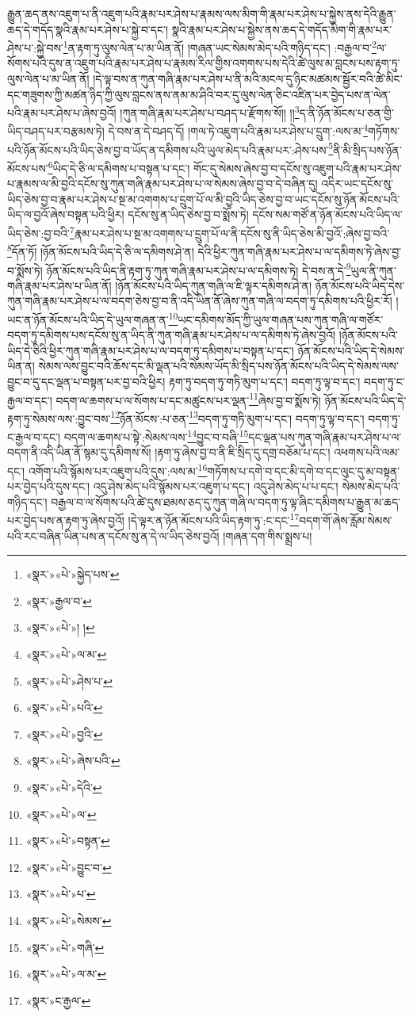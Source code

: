 རྒྱུན་ཆད་ནས་འཇུག་པ་ནི་འཇུག་པའི་རྣམ་པར་ཤེས་པ་རྣམས་ལས་མིག་གི་རྣམ་པར་ཤེས་པ་སྐྱེས་ནས་དེའི་རྒྱུན་ཆད་དེ་གདོད་སྣའི་རྣམ་པར་ཤེས་པ་སྐྱེ་བ་དང་། སྣའི་རྣམ་པར་ཤེས་པ་སྐྱེས་ནས་ཆད་དེ་གདོད་མིག་གི་རྣམ་པར་ཤེས་པ་:སྐྱེ་བས་\footnote{«སྣར་»«པེ་»སྐྱེད་པས་}ན་རྟག་ཏུ་ལུས་ལེན་པ་མ་ཡིན་ནོ། །གཞན་ཡང་སེམས་མེད་པའི་གཉིད་དང་། :བརྒྱལ་བ་\footnote{«སྣར་»རྒྱལ་བ་}ལ་སོགས་པའི་དུས་ན་འཇུག་པའི་རྣམ་པར་ཤེས་པ་རྣམས་རིལ་གྱིས་འགགས་པས་དེའི་ཚེ་ལུས་མ་བླངས་པས་རྟག་ཏུ་ལུས་ལེན་པ་མ་ཡིན་ནོ། །དེ་ལྟ་བས་ན་ཀུན་གཞི་རྣམ་པར་ཤེས་པ་ནི་མའི་མངལ་དུ་ཉིང་མཚམས་སྦྱོར་བའི་ཚེ་མིང་དང་གཟུགས་ཀྱི་མཚན་ཉིད་ཀྱི་ལུས་བླངས་ནས་ནམ་མ་ཤིའི་བར་དུ་ལུས་ལེན་ཅིང་འཛིན་པར་བྱེད་པས་ན་ལེན་པའི་རྣམ་པར་ཤེས་པ་ཞེས་བྱའོ། །ཀུན་གཞི་རྣམ་པར་ཤེས་པ་བཤད་པ་རྫོགས་སོ།། །།\footnote{«སྣར་»«པེ་»། །}ད་ནི་ཉོན་མོངས་པ་ཅན་གྱི་ཡིད་བཤད་པར་བརྩམས་ཏེ། དེ་བས་ན་དེ་བཤད་དོ། །གལ་ཏེ་འཇུག་པའི་རྣམ་པར་ཤེས་པ་དྲུག་:ལས་མ་\footnote{«སྣར་»«པེ་»ལ་མ་}གཏོགས་པའི་ཉོན་མོངས་པའི་ཡིད་ཅེས་བྱ་བ་ཡོད་ན་དམིགས་པའི་ཡུལ་མེད་པའི་རྣམ་པར་:ཤེས་པས་\footnote{«སྣར་»«པེ་»ཤེས་པ་}ནི་མི་སྲིད་པས་ཉོན་མོངས་པས་\footnote{«སྣར་»«པེ་»པའི་}ཡིད་དེ་ཅི་ལ་དམིགས་པ་བསྟན་པ་དང་། གོང་དུ་སེམས་ཞེས་བྱ་བ་དངོས་སུ་འཇུག་པའི་རྣམ་པར་ཤེས་པ་རྣམས་ལ་མི་བྱའི་དངོས་སུ་ཀུན་གཞི་རྣམ་པར་ཤེས་པ་ལ་སེམས་ཞེས་བྱ་བ་དེ་བཞིན་དུ། འདིར་ཡང་དངོས་སུ་ཡིད་ཅེས་བྱ་བ་རྣམ་པར་ཤེས་པ་སྔ་མ་འགགས་པ་དྲུག་པོ་ལ་མི་བྱའི་ཡིད་ཅེས་བྱ་བ་ཡང་དངོས་སུ་ཉོན་མོངས་པའི་ཡིད་ལ་བྱའོ་ཞེས་བསྟན་པའི་ཕྱིར། དངོས་སུ་ན་ཡིད་ཅེས་བྱ་བ་སྨོས་ཏེ། དངོས་སམ་གཙོ་ན་ཉོན་མོངས་པའི་ཡིད་ལ་ཡིད་ཅེས་:བྱ་བའི་\footnote{«སྣར་»«པེ་»བྱའི་}རྣམ་པར་ཤེས་པ་སྔ་མ་འགགས་པ་དྲུག་པོ་ལ་ནི་དངོས་སུ་ནི་ཡིད་ཅེས་མི་བྱའོ་:ཞེས་བྱ་བའི་\footnote{«སྣར་»«པེ་»ཞེས་པའི་}དོན་ཏོ། །ཉོན་མོངས་པའི་ཡིད་དེ་ཅི་ལ་དམིགས་ཤེ་ན། དེའི་ཕྱིར་ཀུན་གཞི་རྣམ་པར་ཤེས་པ་ལ་དམིགས་ཏེ་ཞེས་བྱ་བ་སྨོས་ཏེ། ཉོན་མོངས་པའི་ཡིད་ནི་རྟག་ཏུ་ཀུན་གཞི་རྣམ་པར་ཤེས་པ་ལ་དམིགས་ཏེ། དེ་བས་ན་དེ་\footnote{«སྣར་»«པེ་»དེའི་}ཡུལ་ནི་ཀུན་གཞི་རྣམ་པར་ཤེས་པ་ཡིན་ནོ། །ཉོན་མོངས་པའི་ཡིད་ཀུན་གཞི་ལ་ཇི་ལྟར་དམིགས་ཤེ་ན། ཉོན་མོངས་པའི་ཡིད་དེས་ཀུན་གཞི་རྣམ་པར་ཤེས་པ་ལ་བདག་ཅེས་བྱ་བ་ནི་འདི་ཡིན་ནོ་ཞེས་ཀུན་གཞི་ལ་བདག་ཏུ་དམིགས་པའི་ཕྱིར་རོ། །ཡང་ན་ཉོན་མོངས་པའི་ཡིད་དེ་ཡུལ་གཞན་ན་\footnote{«སྣར་»«པེ་»ལ་}ཡང་དམིགས་མོད་ཀྱི་ཡུལ་གཞན་པས་ཀུན་གཞི་ལ་གཙོར་བདག་ཏུ་དམིགས་པས་དངོས་སུ་ན་ཡིད་ནི་ཀུན་གཞི་རྣམ་པར་ཤེས་པ་ལ་དམིགས་ཏེ་ཞེས་བྱའོ། །ཉོན་མོངས་པའི་ཡིད་དེ་ཅིའི་ཕྱིར་ཀུན་གཞི་རྣམ་པར་ཤེས་པ་ལ་བདག་ཏུ་དམིགས་པ་བསྟན་པ་དང་། ཉོན་མོངས་པའི་ཡིད་དེ་སེམས་ཡིན་ན། སེམས་ལས་བྱུང་བའི་ཆོས་དང་མི་ལྡན་པའི་སེམས་ཡོད་མི་སྲིད་པས་ཉོན་མོངས་པའི་ཡིད་དེ་སེམས་ལས་བྱུང་བ་དུ་དང་ལྡན་པ་བསྟན་པར་བྱ་བའི་ཕྱིར། རྟག་ཏུ་བདག་ཏུ་གཏི་མུག་པ་དང་། བདག་ཏུ་ལྟ་བ་དང་། བདག་ཏུ་ང་རྒྱལ་བ་དང་། བདག་ལ་ཆགས་པ་ལ་སོགས་པ་དང་མཚུངས་པར་ལྡན་\footnote{«སྣར་»«པེ་»བསྟན་}ཞེས་བྱ་བ་སྨོས་ཏེ། ཉོན་མོངས་པའི་ཡིད་དེ་རྟག་ཏུ་སེམས་ལས་:བྱུང་བས་\footnote{«སྣར་»«པེ་»བྱུང་བ་}ཉོན་མོངས་:པ་ཅན་\footnote{«སྣར་»«པེ་»པ་}བདག་ཏུ་གཏི་མུག་པ་དང་། བདག་ཏུ་ལྟ་བ་དང་། བདག་ཏུ་ང་རྒྱལ་བ་དང་། བདག་ལ་ཆགས་པ་སྟེ་:སེམས་ལས་\footnote{«སྣར་»«པེ་»སེམས་}བྱུང་བ་བཞི་\footnote{«སྣར་»«པེ་»གཞི་}དང་ལྡན་པས་ཀུན་གཞི་རྣམ་པར་ཤེས་པ་ལ་བདག་ནི་འདི་ཡིན་ནོ་སྙམ་དུ་དམིགས་སོ། །རྟག་ཏུ་ཞེས་བྱ་བ་ནི་ཇི་སྲིད་དུ་དགྲ་བཅོམ་པ་དང་། འཕགས་པའི་ལམ་དང་། འགོག་པའི་སྙོམས་པར་འཇུག་པའི་དུས་:ལས་མ་\footnote{«སྣར་»«པེ་»ལ་མ་}གཏོགས་པ་དགེ་བ་དང་མི་དགེ་བ་དང་ལུང་དུ་མ་བསྟན་པར་བྱེད་པའི་དུས་དང་། འདུ་ཤེས་མེད་པའི་སྙོམས་པར་འཇུག་པ་དང་། འདུ་ཤེས་མེད་པ་པ་དང་། སེམས་མེད་པའི་གཉིད་དང་། བརྒྱལ་བ་ལ་སོགས་པའི་ཚེ་དུས་ཐམས་ཅད་དུ་ཀུན་གཞི་ལ་བདག་ཏུ་ལྟ་ཞིང་དམིགས་པ་རྒྱུན་མ་ཆད་པར་བྱེད་པས་ན་རྟག་ཏུ་ཞེས་བྱའོ། །དེ་ལྟར་ན་ཉོན་མོངས་པའི་ཡིད་རྟག་ཏུ་:ང་དང་\footnote{«སྣར་»ང་རྒྱལ་}བདག་གོ་ཞེས་རློམ་སེམས་པའི་རང་བཞིན་ཡིན་པས་ན་དངོས་སུ་ན་དེ་ལ་ཡིད་ཅེས་བྱའོ། །གཞན་དག་གིས་སྨྲས་པ། 